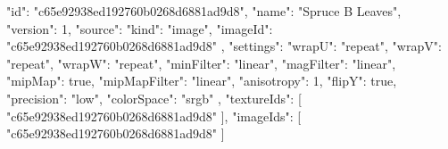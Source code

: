 {
  "id": "c65e92938ed192760b0268d6881ad9d8",
  "name": "Spruce B Leaves",
  "version": 1,
  "source": {
    "kind": "image",
    "imageId": "c65e92938ed192760b0268d6881ad9d8"
  },
  "settings": {
    "wrapU": "repeat",
    "wrapV": "repeat",
    "wrapW": "repeat",
    "minFilter": "linear",
    "magFilter": "linear",
    "mipMap": true,
    "mipMapFilter": "linear",
    "anisotropy": 1,
    "flipY": true,
    "precision": "low",
    "colorSpace": "srgb"
  },
  "textureIds": [
    "c65e92938ed192760b0268d6881ad9d8"
  ],
  "imageIds": [
    "c65e92938ed192760b0268d6881ad9d8"
  ]
}
